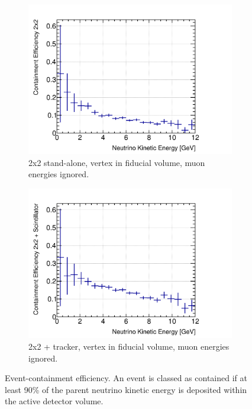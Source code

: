 \documentclass[10pt,a4paper,openany]{article}
\begin{document}
\begin{figure}[!htb]
	\centering
	\begin{subfigure}[b]{0.49\textwidth}
		\centering
    \includegraphics[width=1.0\textwidth]{E_cont_eff_2x2_fiducial_gap_no_muon.png}
		\caption{2x2 stand-alone, vertex in fiducial volume, muon energies ignored.}
		\label{}
	\end{subfigure}	
	\hfill
	\begin{subfigure}[b]{0.49\textwidth}
		\centering
		\includegraphics[width=1.0\textwidth]{E_cont_eff_2x2_Scintillator_fiducial_gap_no_muon.png}
		\caption{2x2 + tracker, vertex in fiducial volume, muon energies ignored.}
		\label{}
	\end{subfigure}	
  \caption{Event-containment efficiency. An event is classed as contained if at least 90\% of the parent neutrino kinetic energy is deposited within the active detector volume.}
\end{figure}
\end{document}
